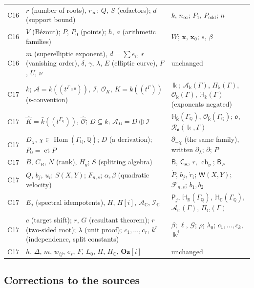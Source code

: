 \documentclass[11pt,oneside]{article}
\numberwithin{equation}{section}
\theoremstyle{definition}
\theoremstyle{remark}
\newcommand{\Oz}{\mathbf{Oz}}
\newcommand{\Q}{\mathbb Q}
\newcommand{\R}{\mathbb R}
\newcommand{\C}{\mathbb C}
\newcommand{\ct}{\operatorname{ct}}
\newcommand{\crH}{\mathbb H_\Bbbk(\Gamma)}
\newcommand{\crA}{\mathcal A_\Bbbk(\Gamma)}
\newcommand{\crP}{\Pi_\Bbbk(\Gamma)}
\newcommand{\crO}{\mathcal O_\Bbbk(\Gamma)}
\newcommand{\Hom}{\operatorname{Hom}}
\newcommand{\Hbar}{\mathbb H_{\bar\Bbbk}(\Gamma_\Q)}
\newcommand{\Obar}{\mathcal O_{\bar\Bbbk}(\Gamma_\Q)}
\begin{document}
\begin{longtable}{>{\raggedright\arraybackslash}p{}>{\raggedright\arraybackslash}p{}>{\raggedright\arraybackslash}p{}}
C16 & $r$ (number of roots), $r_\infty$; $Q$, $S$ (cofactors); $d$ (support bound) & $k$,
$n_\infty$; $P_1$, $P_{\mathrm{odd}}$; $n$\\
C16 & $V$ (B\'ezout); $P$, $P_0$ (points); $h$, $a$ (arithmetic families) & $W$;
$\mathbf x$, $\mathbf x_0$; $s$, $\beta$\\
C16 & $m$ (superelliptic exponent), $d=\sum e_i$, $r$ (vanishing order), $\delta$, $\gamma$,
$\lambda$, $E$ (elliptic curve), $F$, $U$, $\nu$ & unchanged\\
C17 & $k$; $\mathcal A=k((t^{\Gamma_{\le0}}))$, $\mathcal I$, $\mathcal O_K$,
$K=k((t^\Gamma))$ ($t$-convention) & $\Bbbk$; $\crA$, $\crP$, $\crO$, $\crH$ (exponents
negated)\\
C17 & $\widehat K=\bar k((t^{\Gamma_\Q}))$, $\widehat{\mathcal O}$; $D\subseteq k$,
$\mathcal A_D=D\oplus\mathcal I$ & $\Hbar$, $\Obar$; $\mathfrak o$,
$\mathcal R_{\mathfrak o}(\Bbbk,\Gamma)$\\
C17 & $D_\chi$, $\chi\in\Hom(\Gamma_\Q,\Q)$; $D$ (a derivation); $P_0=\ct P$ &
$\partial_{-\chi}$ (the same family), written $\partial_\lambda$; $\partial$; $\overline P$\\
C17 & $B$, $C_B$, $N$ (rank), $H_y$; $S$ (splitting algebra) & $\mathsf B$,
$\mathsf C_{\mathsf B}$, $r$, $\operatorname{ch}_y$; $\mathsf B_P$\\
C17 & $Q$, $b_j$, $u_i$; $S(X,Y)$; $F_{n,s}$; $\alpha,\beta$ (quadratic velocity) &
$\dot P$, $b_j$, $\dot r_i$; $\mathsf W(X,Y)$; $\mathcal F_{n,s}$; $b_1,b_2$\\
C17 & $E_j$ (spectral idempotents), $H$, $H[i]$, $\mathcal A_\C$, $\mathcal I_\C$ &
$\mathsf P_j$, $\mathbb H_\R(\Gamma_\Q)$, $\mathbb H_\C(\Gamma_\Q)$, $\mathcal A_\C(\Gamma)$,
$\Pi_\C(\Gamma)$\\
C17 & $c$ (target shift); $r$, $G$ (resultant theorem); $r$ (two-sided root); $\lambda$
(unit proof); $c_1,\ldots,c_r$, $k^r$ (independence, split constants) & $\beta$; $\ell$,
$\mathcal G$; $\rho$; $\lambda_0$; $c_1,\ldots,c_k$, $\Bbbk^j$\\
C17 & $h$, $\Delta$, $m$, $w_{ij}$, $e_s$, $F$, $L_0$, $\Pi$, $\Pi_\C$, $\Oz[i]$ &
unchanged\\
\end{longtable}

\subsection{Corrections to the sources}
\end{document}
